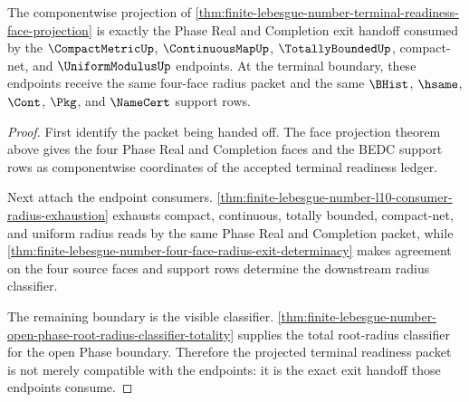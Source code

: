 \begin{theorem}
\label{thm:finite-lebesgue-number-terminal-readiness-exit-handoff}
The componentwise projection of \autoref{thm:finite-lebesgue-number-terminal-readiness-face-projection} is exactly the Phase Real and Completion exit handoff consumed by the $\CompactMetricUp$, $\ContinuousMapUp$, $\TotallyBoundedUp$, compact-net, and $\UniformModulusUp$ endpoints. At the terminal boundary, these endpoints receive the same four-face radius packet and the same $\BHist$, $\hsame$, $\Cont$, $\Pkg$, and $\NameCert$ support rows.
\end{theorem}
\begin{proof}
First identify the packet being handed off. The face projection theorem above gives the four Phase Real and Completion faces and the BEDC support rows as componentwise coordinates of the accepted terminal readiness ledger.

Next attach the endpoint consumers. \autoref{thm:finite-lebesgue-number-l10-consumer-radius-exhaustion} exhausts compact, continuous, totally bounded, compact-net, and uniform radius reads by the same Phase Real and Completion packet, while \autoref{thm:finite-lebesgue-number-four-face-radius-exit-determinacy} makes agreement on the four source faces and support rows determine the downstream radius classifier.

The remaining boundary is the visible classifier. \autoref{thm:finite-lebesgue-number-open-phase-root-radius-classifier-totality} supplies the total root-radius classifier for the open Phase boundary. Therefore the projected terminal readiness packet is not merely compatible with the endpoints: it is the exact exit handoff those endpoints consume.
\end{proof}

